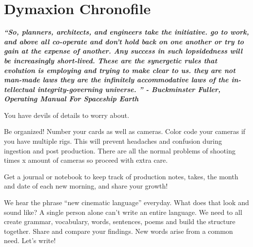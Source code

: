 \chapter{Dymaxion Chronofile}
\pagecolor{white}
\label{chap:29}
\begin{fullwidth}


{\itshape\bfseries “So, planners, architects, and engineers take the initiative. go to work, and above all co-operate and don’t hold back on one another or try to gain at the expense of another. Any success in such lopsidedness will be increasingly short-lived. These are the synergetic rules that evolution is employing and trying to make clear to us. they are not man-made laws they are the infinitely accommodative laws of the in-tellectual integrity-governing universe. ”
- Buckminster Fuller, Operating Manual For Spaceship Earth
}

\vspace{\baselineskip}

\problem

{\large You have devils of details to worry about. 
 \par}

Be organized! Number your cards as well as cameras. Color code your cameras if you have multiple rigs. This will prevent headaches and confusion during ingestion and post production. There are all the normal problems of shooting times x amount of cameras so proceed with extra care. 


\solution

{\large Get a journal or notebook to keep track of production notes, takes, the month and date of each new morning, and share your growth! 

 \par}

We hear the phrase “new cinematic language” everyday. What does that look and sound like? A single person alone can’t write an entire language. We need to all create grammar, vocabulary, words, sentences, poems and build the structure together. Share and compare your findings. New words arise from a common need.  Let’s write!




\clearpage
\end{fullwidth}
